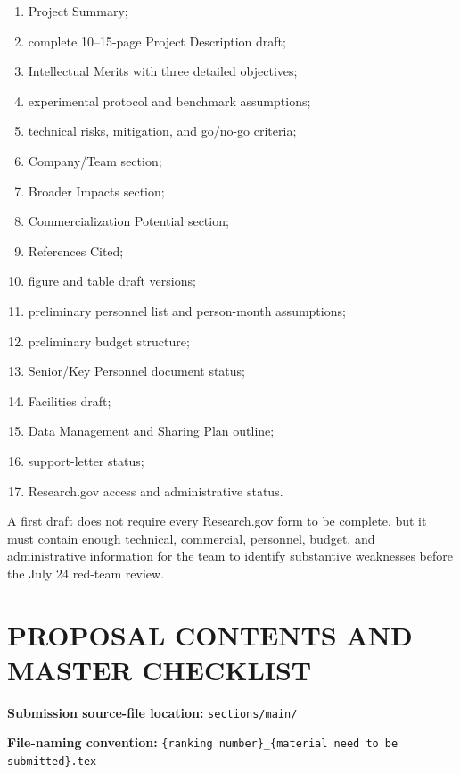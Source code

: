 \documentclass[11pt,letterpaper]{article}
\begin{document}
\begin{enumerate}[leftmargin=0.3in]
    \item Project Summary;
    \item complete 10--15-page Project Description draft;
    \item Intellectual Merits with three detailed objectives;
    \item experimental protocol and benchmark assumptions;
    \item technical risks, mitigation, and go/no-go criteria;
    \item Company/Team section;
    \item Broader Impacts section;
    \item Commercialization Potential section;
    \item References Cited;
    \item figure and table draft versions;
    \item preliminary personnel list and person-month assumptions;
    \item preliminary budget structure;
    \item Senior/Key Personnel document status;
    \item Facilities draft;
    \item Data Management and Sharing Plan outline;
    \item support-letter status;
    \item Research.gov access and administrative status.
\end{enumerate}

A first draft does not require every Research.gov form to be complete, but it
must contain enough technical, commercial, personnel, budget, and
administrative information for the team to identify substantive weaknesses
before the July 24 red-team review.

\newpage
\section*{PROPOSAL CONTENTS AND MASTER CHECKLIST}

\noindent
\textbf{Submission source-file location:}
\texttt{sections/main/}

\noindent
\textbf{File-naming convention:}
\texttt{\{ranking number\}\_\{material need to be submitted\}.tex}
\end{document}
